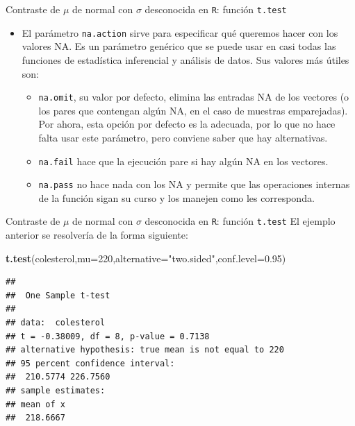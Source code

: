 \documentclass[
  ignorenonframetext,
]{beamer}
\newenvironment{Shaded}{\begin{snugshade}}{\end{snugshade}}
\newcommand{\DataTypeTok}[1]{\textcolor[rgb]{0.13,0.29,0.53}{#1}}
\newcommand{\DecValTok}[1]{\textcolor[rgb]{0.00,0.00,0.81}{#1}}
\newcommand{\FloatTok}[1]{\textcolor[rgb]{0.00,0.00,0.81}{#1}}
\newcommand{\KeywordTok}[1]{\textcolor[rgb]{0.13,0.29,0.53}{\textbf{#1}}}
\newcommand{\NormalTok}[1]{#1}
\newcommand{\StringTok}[1]{\textcolor[rgb]{0.31,0.60,0.02}{#1}}
\begin{document}
\begin{frame}[fragile]{Contraste de \(\mu\) de normal con \(\sigma\)
desconocida en \texttt{R}: función \texttt{t.test}}
\protect\hypertarget{contraste-de-mu-de-normal-con-sigma-desconocida-en-r-funciuxf3n-t.test-2}{}
\begin{itemize}[<+->]
\item
  El parámetro \texttt{na.action} sirve para especificar qué queremos
  hacer con los valores NA. Es un parámetro genérico que se puede usar
  en casi todas las funciones de estadística inferencial y análisis de
  datos. Sus valores más útiles son:

  \begin{itemize}[<+->]
  \item
    \texttt{na.omit}, su valor por defecto, elimina las entradas NA de
    los vectores (o los pares que contengan algún NA, en el caso de
    muestras emparejadas). Por ahora, esta opción por defecto es la
    adecuada, por lo que no hace falta usar este parámetro, pero
    conviene saber que hay alternativas.
  \item
    \texttt{na.fail} hace que la ejecución pare si hay algún NA en los
    vectores.
  \item
    \texttt{na.pass} no hace nada con los NA y permite que las
    operaciones internas de la función sigan su curso y los manejen como
    les corresponda.
  \end{itemize}
\end{itemize}
\end{frame}

\begin{frame}[fragile]{Contraste de \(\mu\) de normal con \(\sigma\)
desconocida en \texttt{R}: función \texttt{t.test}}
\protect\hypertarget{contraste-de-mu-de-normal-con-sigma-desconocida-en-r-funciuxf3n-t.test-3}{}
El ejemplo anterior se resolvería de la forma siguiente:

\begin{Shaded}
\begin{Highlighting}[]
\KeywordTok{t.test}\NormalTok{(colesterol,}\DataTypeTok{mu=}\DecValTok{220}\NormalTok{,}\DataTypeTok{alternative=}\StringTok{"two.sided"}\NormalTok{,}\DataTypeTok{conf.level=}\FloatTok{0.95}\NormalTok{)   }
\end{Highlighting}
\end{Shaded}

\begin{verbatim}
## 
##  One Sample t-test
## 
## data:  colesterol
## t = -0.38009, df = 8, p-value = 0.7138
## alternative hypothesis: true mean is not equal to 220
## 95 percent confidence interval:
##  210.5774 226.7560
## sample estimates:
## mean of x 
##  218.6667
\end{verbatim}
\end{frame}
\end{document}
